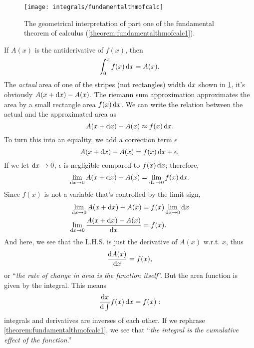 \begin{figure}[b]
    \centering
    \texttt{[image: integrals/fundamentalthmofcalc]}
    \caption{The geometrical interpretation of part one of the fundamental theorem of calculus (\cref{theorem:fundamentalthmofcalc1}).}
    \label{fig:fundamentalthmofcalc}
\end{figure}
If $A(x)$ is the antiderivative of $f(x)$, then
\begin{equation}
    \int_{0}^{x} f(x)\odif{x} = A(x).
\end{equation}
The \emph{actual} area of one of the stripes (not rectangles) width $\odif{x}$ shown in \cref{fig:fundamentalthmofcalc}, it's obviously $A(x + \odif{x}) - A(x)$. The riemann sum approximation approximates the area by a small rectangle area $f(x)\odif{x}$. We can write the relation between the actual and the approximated area as
\begin{equation}
    A(x + \odif{x}) - A(x) \approx f(x)\odif{x}.
\end{equation}
To turn this into an equality, we add a correction term $\epsilon$
\begin{equation}
    A(x + \odif{x}) - A(x) = f(x)\odif{x} + \epsilon.
\end{equation}
If we let $\odif{x} \appr 0$, $\epsilon$ is negligible compared to $f(x)\odif{x}$; therefore,
\begin{equation}
    \lim_{\odif{x} \appr 0}A(x + \odif{x}) - A(x) = \lim_{\odif{x} \appr 0}f(x)\odif{x}.
\end{equation}
Since $f(x)$ is not a variable that's controlled by the limit sign,
\begin{align*}
    \lim_{\odif{x} \appr 0}A(x + \odif{x}) - A(x) &= f(x)\lim_{\odif{x} \appr 0}\odif{x} \\
    \lim_{\odif{x} \appr 0}\frac{A(x + \odif{x}) - A(x)}{\odif{x}} &= f(x).
\end{align*}
And here, we see that the L.H.S. is just the derivative of $A(x)$ w.r.t. $x$, thus
\begin{equation}
    \odv{A(x)}{x} = f(x),
\end{equation}
or ``\textit{the rate of change in area is the function itself}''. But the area function is given by the integral. This means
\begin{equation}
    \odv{x}\int f(x)\odif{x} = f(x):
\end{equation}
integrals and derivatives are inverses of each other. If we rephrase \cref{theorem:fundamentalthmofcalc1}, we see that ``\textit{the integral is the cumulative effect of the function}.''

